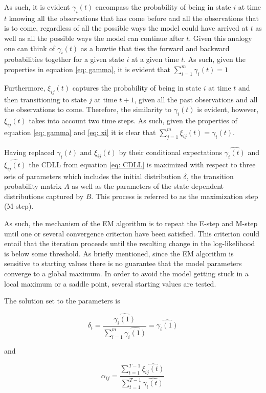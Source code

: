 As such, it is evident $\gamma_i(t)$ encompass the probability of being in state $i$ at time $t$ knowing all the observations that has come before and all the observations that is to come, regardless of all the possible ways the model could have arrived at $t$ as well as all the possible ways the model can continue after $t$. Given this analogy one can think of $\gamma_i(t)$ as a bowtie that ties the forward and backward probabilities together for a given state $i$ at a given time $t$. As such, given the properties in equation \ref{eq: gamma}, it is evident that $\sum_{i=1}^m \gamma_i(t) = 1$

Furthermore, $\xi_{ij}(t)$ captures the probability of being in state $i$ at time $t$ and then transitioning to state $j$ at time $t+1$, given all the past observations and all the observations to come. Therefore, the similarity to $\gamma_i(t)$ is evident, however, $\xi_{ij}(t)$ takes into account two time steps. As such, given the properties of equation \ref{eq: gamma} and \ref{eq: xi} it is clear that $\sum_{j=1}^m \xi_{ij}(t) = \gamma_i(t)$. 

Having replaced $\gamma_i(t)$ and $\xi_{ij}(t)$ by their conditional expectations $\hat{\gamma_i(t)}$ and $\hat{\xi_{ij}(t)}$ the CDLL from equation \ref{eq: CDLL} is maximized with respect to three sets of parameters which includes the initial distribution $\delta$, the transition probability matrix $A$ as well as the parameters of the state dependent distributions captured by $B$. This process is referred to as the maximization step (M-step). 

As such, the mechanism of the EM algorithm is to repeat the E-step and M-step until one or several convergence criterion have been satisfied. This criterion could entail that the iteration proceeds until the resulting change in the log-likelihood is below some threshold. As briefly mentioned, since the EM algorithm is sensitive to starting values there is no guarantee that the model parameters converge to a global maximum. In order to avoid the model getting stuck in a local maximum or a saddle point, several starting values are tested. 

The solution set to the parameters is 

\begin{equation}
    \delta_i = \frac{\hat{\gamma_i(1)}}{\sum_{i=1}^m\hat{\gamma_i(1)}} = \hat{\gamma_i(1)}
\end{equation}

and

\begin{equation}
    \alpha_{ij} = \frac{\sum_{t=1}^{T-1}\hat{\xi_{ij}(t)}}{\sum_{t=1}^{T-1}\hat{\gamma_i(t)}}
\end{equation}

